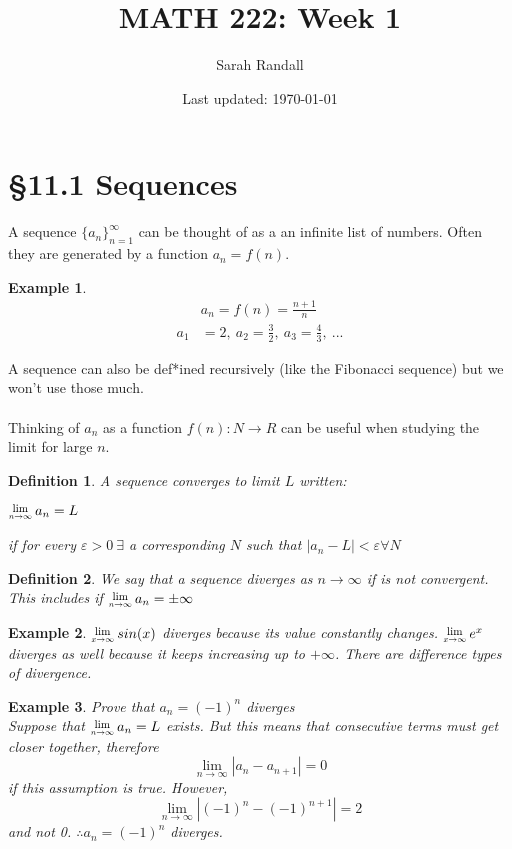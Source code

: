 \documentclass[12 pt]{article}
\author{Sarah Randall}
\date{Last updated: \today}
\title{MATH 222: Week 1}
\newcommand{\Lim}[1]{\raisebox{0.5ex}{\scalebox{0.8}{$\displaystyle \lim_{#1}\;$}}}
\newcommand{\toinfty}{\rightarrow\infty}
\newtheorem*{exmp*}{Example}
\newtheorem*{def*}{Definition}
\begin{document}
	\onehalfspacing
	\maketitle
	\tableofcontents
	\section{\S 11.1 Sequences}
		A sequence $\{a_n\}_{n=1}^{\infty}$ can be thought of as a an infinite
		list of numbers. Often they are generated by a function $a_n=f(n)$.\\
		\begin{exmp*}
			\begin{align*}
				&a_n=f(n)=\frac{n+1}{n}
				\\a_1&=2,\ a_2=\frac{3}{2},\ a_3=\frac{4}{3},\ ...
			\end{align*}
		\end{exmp*}
		A sequence can also be def*ined recursively (like the Fibonacci sequence)
		but we won't use those much.\\\\
		Thinking of $a_n$ as a function $f(n):N\rightarrow R$ can be useful
		when studying the limit for large $n$.
		\begin{def*}
			A sequence converges to limit $L$ written:
			\begin{center}
				$\Lim{n\toinfty} a_n=L$
			\end{center}
			if for every $\varepsilon>0\ \exists$ a corresponding $N$ such that
			$\left|a_n-L\right| < \varepsilon \forall N$
		\end{def*}
		\begin{def*}
			We say that a sequence diverges as $n\toinfty$ if is not
			convergent. This includes if $\Lim{n\toinfty}a_n=\pm\infty$
		\end{def*}
		\begin{exmp*}
			$\Lim{x\toinfty}sin(x)$ diverges because its value constantly
			changes. $\Lim{x\toinfty}e^x$ diverges as well because it
			keeps increasing up to $+\infty$. There are difference types of divergence.
		\end{exmp*}
		\begin{exmp*}
			Prove that $a_n=(-1)^n$ diverges
			\\Suppose that $\Lim{n\toinfty} a_n=L$ exists. But this means
			that consecutive terms must get closer together, therefore\\
			$$\lim_{n\toinfty}\left|a_n-a_{n+1}\right|=0$$
			if this assumption is true. However,
			$$\lim_{n\toinfty}\left|(-1)^n-(-1)^{n+1}\right|=2$$
			and not 0. $\therefore a_n=(-1)^n$ diverges.\\
		\end{exmp*}
\end{document}
